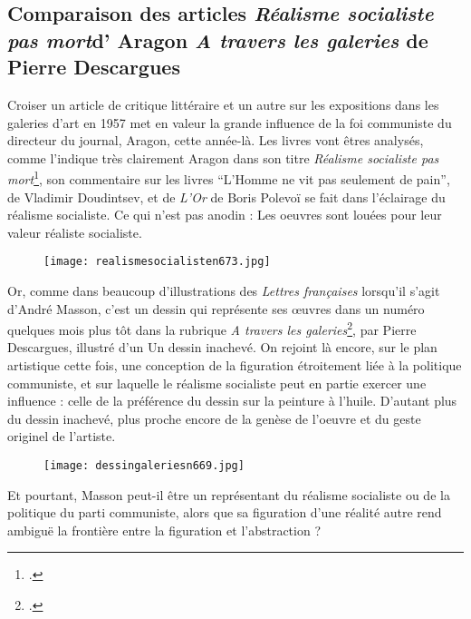 \subsection{Comparaison des articles \emph{ Réalisme socialiste pas mort}d' Aragon \emph{A travers les galeries} de Pierre Descargues}

	Croiser un article de critique littéraire et un autre sur les expositions dans les galeries d’art en 1957 met en valeur la grande influence de la foi communiste du directeur du journal, Aragon, cette année-là. Les livres vont êtres analysés, comme l’indique très clairement Aragon dans son titre \emph{Réalisme socialiste pas mort}\footcite{realsoc}, son commentaire sur les livres \enquote{L’Homme ne vit pas seulement de pain}, de Vladimir Doudintsev, et de \emph{L’Or} de Boris Polevoï se fait dans l’éclairage du réalisme socialiste. Ce qui n’est pas anodin : Les oeuvres sont louées pour leur valeur réaliste socialiste. 

\begin{figure}[H]
   \centering
   \texttt{[image: realismesocialisten673.jpg]}
	\caption{\cite{realsoc}}\label{fig:Réalistesocialistepasmort}
\end{figure}

	

	Or, comme dans beaucoup d’illustrations des \emph{Lettres françaises }lorsqu’il s’agit d’André Masson, c’est un dessin qui représente ses \oe{}uvres dans un numéro quelques mois plus tôt dans la rubrique \emph{A travers les galeries}\footcite{atraversgaleries}, par Pierre Descargues, illustré d'un Un dessin inachevé. On rejoint là encore, sur le plan artistique cette fois, une conception de la figuration étroitement liée à la politique communiste, et sur laquelle le réalisme socialiste peut en partie exercer une influence : celle de la préférence du dessin sur la peinture à l’huile. D’autant plus du dessin inachevé, plus proche encore de la genèse de l’oeuvre et du geste originel de l’artiste. 

\begin{figure}[H]
   \centering
   \texttt{[image: dessingaleriesn669.jpg]}
	\caption{\cite{realsoc}}\label{fig:Atraverslesgaleries}
\end{figure}



	Et pourtant, Masson peut-il être un représentant du réalisme socialiste ou de la politique du parti communiste, alors que sa figuration d’une réalité autre rend ambiguë la frontière entre la figuration et l’abstraction ? 
	

